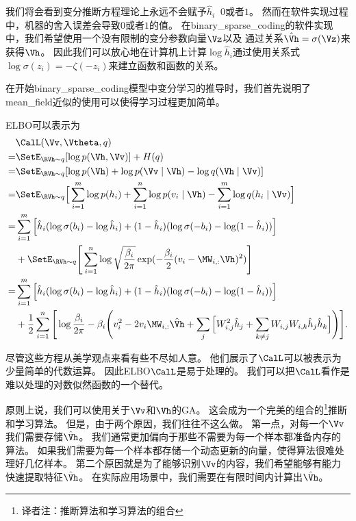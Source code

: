 我们将会看到变分推断方程理论上永远不会赋予$\hat{h}_i\ $ $0$或者$1$。
然而在软件实现过程中，机器的舍入误差会导致$0$或者$1$的值。
在\gls{binary_sparse_coding}的软件实现中，我们希望使用一个没有限制的变分参数向量$\Vz$以及
通过关系$\hat{\Vh} = \sigma(\Vz)$来获得$\Vh$。
因此我们可以放心地在计算机上计算$\log \hat{h}_i$通过使用关系式$\log \sigma(z_i) = -\zeta(-z_i)$来建立函数和函数的关系。


在开始\gls{binary_sparse_coding}模型中变分学习的推导时，我们首先说明了\gls{mean_field}近似的使用可以使得学习过程更加简单。


\gls{ELBO}可以表示为
\begin{align}
& \CalL(\Vv,\Vtheta,q)\\
 = & \SetE_{\RVh\sim q}[\log p(\Vh,\Vv)] + H(q)\\
 = & \SetE_{\RVh\sim q}[\log p(\Vh) + \log p(\Vv\mid\Vh) - \log q(\Vh\mid\Vv)]\\
= & \SetE_{\RVh\sim q}\Big[\sum_{i=1}^{m}\log p(h_i) + \sum_{i=1}^{n} \log p(v_i\mid\Vh) - \sum_{i=1}^{m}\log q(h_i\mid\Vv)\Big]\\
= &  \sum_{i=1}^{m}\Big[\hat{h}_i(\log \sigma(b_i) - \log \hat{h}_i) + (1 - \hat{h}_i)(\log \sigma(-b_i) - \log (1-\hat{h}_i))\Big] \\
& +  \SetE_{\RVh\sim q} \Bigg[ \sum_{i=1}^{n}\log \sqrt{\frac{\beta_i}{2\pi}}\exp(-\frac{\beta_i}{2}(v_i - \MW_{i,:}\Vh)^2)\Bigg] \\
= &  \sum_{i=1}^{m}\Big[\hat{h}_i(\log \sigma(b_i) - \log \hat{h}_i) + (1 - \hat{h}_i)(\log \sigma(-b_i) - \log (1-\hat{h}_i))\Big] \\
& + \frac{1}{2} \sum_{i=1}^{n} \Bigg[ \log {\frac{\beta_i}{2\pi}} - \beta_i \Bigg(v_i^2 - 2 v_i \MW_{i,:}\hat{\Vh} + \sum_{j}\Big[W^2_{i,j}\hat{h}_j + \sum_{k \neq j}W_{i,j}W_{i,k}\hat{h}_j\hat{h}_k \Big] \Bigg) \Bigg]. 
\label{eqn:1936}
\end{align}


尽管这些方程从美学观点来看有些不尽如人意。
他们展示了$\CalL$可以被表示为少量简单的代数运算。
因此\gls{ELBO}$\CalL$是易于处理的。
我们可以把$\CalL$看作是难以处理的对数似然函数的一个替代。


原则上说，我们可以使用关于$\Vv$和$\Vh$的\gls{GA}。
这会成为一个完美的组合的\footnote{译者注：推断算法和学习算法的组合}推断和学习算法。
但是，由于两个原因，我们往往不这么做。
第一点，对每一个$\Vv$我们需要存储$\hat{\Vh}$。
我们通常更加偏向于那些不需要为每一个样本都准备内存的算法。
如果我们需要为每一个样本都存储一个动态更新的向量，使得算法很难处理好几亿样本。
第二个原因就是为了能够识别$\Vv$的内容，我们希望能够有能力快速提取特征$\hat{\Vh}$。
在实际应用场景中，我们需要在有限时间内计算出$\hat{\Vh}$。


